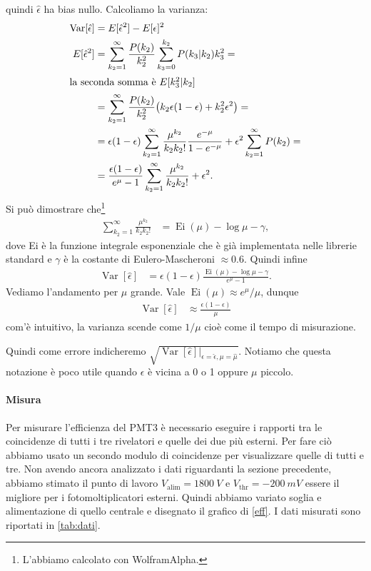 \documentclass[a4paper]{article}
\begin{document}
quindi $\hat\epsilon$ ha bias nullo.
Calcoliamo la varianza:
\begin{align*}
	\operatorname{Var}[\hat\epsilon]
	&= E[\hat\epsilon^2] - E[\epsilon]^2 \\
	E[\hat\epsilon^2]
	&= \sum_{k_2=1}^\infty \frac{P(k_2)}{k_2^2}
	\sum_{k_3=0}^{k_2} P(k_3|k_2) k_3^2 = \\
	\intertext{la seconda somma è $E[k_3^2|k_2]$}
	&= \sum_{k_2=1}^\infty \frac{P(k_2)}{k_2^2}
	\big (k_2\epsilon(1-\epsilon) + k_2^2\epsilon^2 \big) = \\
	&= \epsilon(1-\epsilon) \sum_{k_2=1}^\infty \frac{\mu^{k_2}}{k_2k_2!}\frac{e^{-\mu}}{1-e^{-\mu}}
	+ \epsilon^2 \sum_{k_2=1}^\infty P(k_2) = \\
	&= \frac{\epsilon(1-\epsilon)}{e^{\mu}-1} \sum_{k_2=1}^\infty \frac{\mu^{k_2}}{k_2k_2!} + \epsilon^2.
\end{align*}
Si può dimostrare che\footnote{L'abbiamo calcolato con WolframAlpha.}
\begin{align*}
	\sum_{k_2=1}^\infty \frac{\mu^{k_2}}{k_2k_2!}
	&= \operatorname{Ei}(\mu) - \log\mu - \gamma,
\end{align*}
dove Ei è la funzione integrale esponenziale che è già implementata nelle librerie standard
e $\gamma$ è la costante di Eulero-Mascheroni $\approx 0.6$.
Quindi infine
\begin{align*}
	\operatorname{Var}[\hat\epsilon]
	&= \epsilon(1-\epsilon)\frac{\operatorname{Ei}(\mu) - \log\mu - \gamma}{e^\mu - 1}.
\end{align*}
Vediamo l'andamento per $\mu$ grande.
Vale $\operatorname{Ei}(\mu) \approx e^{\mu}/\mu$, dunque
\begin{align*}
	\operatorname{Var}[\hat\epsilon]
	&\approx \frac{\epsilon(1-\epsilon)}{\mu}
\end{align*}
com'è intuitivo, la varianza scende come $1/\mu$ cioè come il tempo di misurazione.

Quindi come errore indicheremo $\sqrt{\operatorname{Var}[\hat\epsilon]\big|_{\epsilon=\hat\epsilon,\mu=\hat\mu}}$.
Notiamo che questa notazione è poco utile quando $\epsilon$ è vicina a 0 o 1 oppure $\mu$ piccolo.

\paragraph{Misura}

Per misurare l'efficienza del PMT3 è necessario eseguire i rapporti tra le coincidenze di tutti i tre rivelatori e quelle dei due più esterni. Per fare ciò abbiamo usato un secondo modulo di coincidenze per visualizzare quelle di tutti e tre. Non avendo ancora analizzato i dati riguardanti la sezione precedente, abbiamo stimato il punto di lavoro $V_\text{alim}=\SI{1800}{V}$ e $V_{\text{thr}}=\SI{-200}{mV}$ essere il migliore per i fotomoltiplicatori esterni. Quindi abbiamo variato soglia e alimentazione di quello centrale e disegnato il grafico di \autoref{eff}.
I dati misurati sono riportati in \autoref{tab:dati}.
\end{document}
